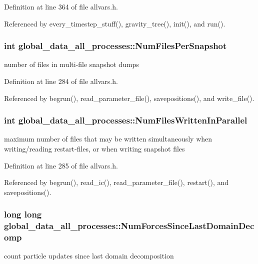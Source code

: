 Definition at line 364 of file allvars.h.



Referenced by every\_\-timestep\_\-stuff(), gravity\_\-tree(), init(), and run().

\hypertarget{structglobal__data__all__processes_a3749135400fbf51c319054233d7a64a7}{
\subsubsection[{NumFilesPerSnapshot}]{\setlength{\rightskip}{0pt plus 5cm}int {\bf global\_\-data\_\-all\_\-processes::NumFilesPerSnapshot}}}
\label{structglobal__data__all__processes_a3749135400fbf51c319054233d7a64a7}
number of files in multi-\/file snapshot dumps 

Definition at line 284 of file allvars.h.



Referenced by begrun(), read\_\-parameter\_\-file(), savepositions(), and write\_\-file().

\hypertarget{structglobal__data__all__processes_a0e328240a1fb59c7bf55332a1a691029}{
\subsubsection[{NumFilesWrittenInParallel}]{\setlength{\rightskip}{0pt plus 5cm}int {\bf global\_\-data\_\-all\_\-processes::NumFilesWrittenInParallel}}}
\label{structglobal__data__all__processes_a0e328240a1fb59c7bf55332a1a691029}
maximum number of files that may be written simultaneously when writing/reading restart-\/files, or when writing snapshot files 

Definition at line 285 of file allvars.h.



Referenced by begrun(), read\_\-ic(), read\_\-parameter\_\-file(), restart(), and savepositions().

\hypertarget{structglobal__data__all__processes_a64e0b5f35f25dd09297bc41acf0502f7}{
\subsubsection[{NumForcesSinceLastDomainDecomp}]{\setlength{\rightskip}{0pt plus 5cm}long long {\bf global\_\-data\_\-all\_\-processes::NumForcesSinceLastDomainDecomp}}}
\label{structglobal__data__all__processes_a64e0b5f35f25dd09297bc41acf0502f7}
count particle updates since last domain decomposition 


